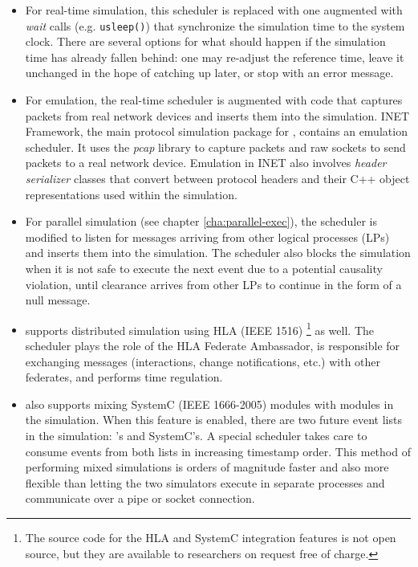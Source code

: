 \begin{itemize}
  \item For real-time simulation, this scheduler is replaced with one augmented
    with \textit{wait} calls (e.g. \texttt{usleep()}) that synchronize the
    simulation time to the system clock. There are several options for what should
    happen if the simulation time has already fallen behind: one may re-adjust the
    reference time, leave it unchanged in the hope of catching up later, or stop
    with an error message.

  \item For emulation, the real-time scheduler is augmented with code that
    captures packets from real network devices and inserts them into the simulation.
    INET Framework, the main protocol simulation package for {\opp}, contains an
    emulation scheduler. It uses the \textit{pcap} library to capture packets and
    raw sockets to send packets to a real network device. Emulation in INET also
    involves \textit{header serializer} classes that convert between protocol
    headers and their C++ object representations used within the simulation.

  \item For parallel simulation (see chapter \ref{cha:parallel-exec}), the
    scheduler is modified to listen for messages arriving from other logical
    processes (LPs) and inserts them into the simulation. The scheduler also blocks
    the simulation when it is not safe to execute the next event due to a potential
    causality violation, until clearance arrives from other LPs to continue in the
    form of a null message.

  \item {\opp} supports distributed simulation using HLA (IEEE 1516) \footnote{The
    source code for the HLA and SystemC integration features is not open source, but
    they are available to researchers on request free of charge.} as well. The
    scheduler plays the role of the HLA Federate Ambassador, is responsible for
    exchanging messages (interactions, change notifications, etc.) with other
    federates, and performs time regulation.

  \item {\opp} also supports mixing SystemC (IEEE 1666-2005) modules with {\opp}
    modules in the simulation. When this feature is enabled, there are two future
    event lists in the simulation: {\opp}'s and SystemC's. A special scheduler takes
    care to consume events from both lists in increasing timestamp order. This
    method of performing mixed simulations is orders of magnitude faster and also
    more flexible than letting the two simulators execute in separate processes and
    communicate over a pipe or socket connection.
\end{itemize}

